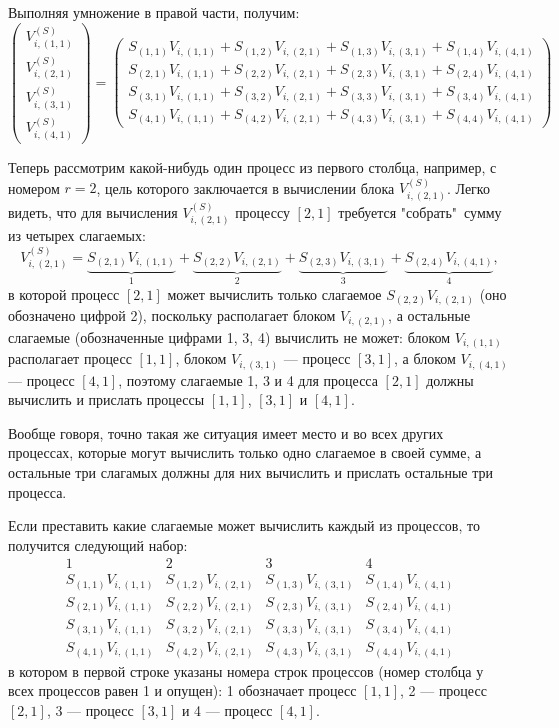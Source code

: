 Выполняя умножение в правой части, получим:
$$
	\begin{pmatrix}
		V_{i,(1,1)}^{(S)} \\
		V_{i,(2,1)}^{(S)} \\
		V_{i,(3,1)}^{(S)} \\
		V_{i,(4,1)}^{(S)}
	\end{pmatrix}
	=
	\begin{pmatrix}
		S_{(1,1)} V_{i,(1,1)} + S_{(1,2)} V_{i,(2,1)} + S_{(1,3)} V_{i,(3,1)} + S_{(1,4)} V_{i,(4,1)} \\
		S_{(2,1)} V_{i,(1,1)} + S_{(2,2)} V_{i,(2,1)} + S_{(2,3)} V_{i,(3,1)} + S_{(2,4)} V_{i,(4,1)} \\
		S_{(3,1)} V_{i,(1,1)} + S_{(3,2)} V_{i,(2,1)} + S_{(3,3)} V_{i,(3,1)} + S_{(3,4)} V_{i,(4,1)} \\
		S_{(4,1)} V_{i,(1,1)} + S_{(4,2)} V_{i,(2,1)} + S_{(4,3)} V_{i,(3,1)} + S_{(4,4)} V_{i,(4,1)}
	\end{pmatrix}
$$

Теперь рассмотрим какой-нибудь один процесс из первого столбца, например, с номером $r=2$, цель которого заключается в вычислении блока $V_{i,(2,1)}^{(S)}$. Легко видеть, что
для вычисления $V_{i,(2,1)}^{(S)}$ процессу $[2,1]$ требуется "собрать"\ сумму из четырех слагаемых:
$$
	V_{i,(2,1)}^{(S)}
	= \underbrace{S_{(2,1)} V_{i,(1,1)}}_1
	+ \underbrace{S_{(2,2)} V_{i,(2,1)}}_2
	+ \underbrace{S_{(2,3)} V_{i,(3,1)}}_3
	+ \underbrace{S_{(2,4)} V_{i,(4,1)}}_4
	,
$$
в которой процесс $[2,1]$ может вычислить только слагаемое $S_{(2,2)} V_{i,(2,1)}$ (оно обозначено цифрой 2), поскольку располагает блоком $V_{i,(2,1)}$, а остальные слагаемые
(обозначенные цифрами 1, 3, 4) вычислить не может: блоком $V_{i,(1,1)}$ располагает процесс $[1,1]$, блоком $V_{i,(3,1)}$ --- процесс $[3,1]$, а блоком $V_{i,(4,1)}$ ---
процесс $[4,1]$, поэтому слагаемые 1, 3 и 4 для процесса $[2,1]$ должны вычислить и прислать процессы $[1,1]$, $[3,1]$ и $[4,1]$.

Вообще говоря, точно такая же ситуация имеет место и во всех других процессах, которые могут вычислить только одно слагаемое в своей сумме, а остальные три слагамых должны
для них вычислить и прислать остальные три процесса.

Если преставить какие слагаемые может вычислить каждый из процессов, то получится следующий набор:
$$
	\begin{array}{cccc}
		1                     & 2                     & 3                     & 4 \\
		S_{(1,1)} V_{i,(1,1)} & S_{(1,2)} V_{i,(2,1)} & S_{(1,3)} V_{i,(3,1)} & S_{(1,4)} V_{i,(4,1)} \\
		S_{(2,1)} V_{i,(1,1)} & S_{(2,2)} V_{i,(2,1)} & S_{(2,3)} V_{i,(3,1)} & S_{(2,4)} V_{i,(4,1)} \\
		S_{(3,1)} V_{i,(1,1)} & S_{(3,2)} V_{i,(2,1)} & S_{(3,3)} V_{i,(3,1)} & S_{(3,4)} V_{i,(4,1)} \\
		S_{(4,1)} V_{i,(1,1)} & S_{(4,2)} V_{i,(2,1)} & S_{(4,3)} V_{i,(3,1)} & S_{(4,4)} V_{i,(4,1)}
	\end{array}
$$
в котором в первой строке указаны номера строк процессов (номер столбца у всех процессов равен 1 и опущен): 1 обозначает процесс $[1,1]$, 2 --- процесс $[2,1]$,
3 --- процесс $[3,1]$ и 4 --- процесс $[4,1]$.

